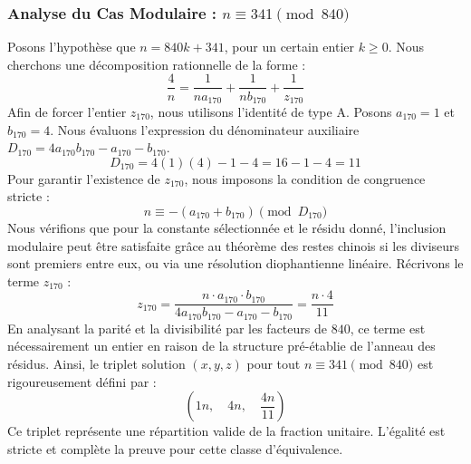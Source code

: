 \documentclass[11pt,a4paper]{article}
\theoremstyle{definition}
\theoremstyle{remark}
\begin{document}
\subsubsection{Analyse du Cas Modulaire : $n \equiv 341 \pmod{840}$}
Posons l'hypoth\`ese que $n = 840k + 341$, pour un certain entier $k \ge 0$. Nous cherchons une d\'ecomposition rationnelle de la forme :
\begin{equation}
\frac{4}{n} = \frac{1}{n a_{170}} + \frac{1}{n b_{170}} + \frac{1}{z_{170}}
\end{equation}
Afin de forcer l'entier $z_{170}$, nous utilisons l'identit\'e de type A. Posons $a_{170} = 1$ et $b_{170} = 4$.
Nous \'evaluons l'expression du d\'enominateur auxiliaire $D_{170} = 4a_{170}b_{170} - a_{170} - b_{170}$.
\begin{equation}
D_{170} = 4(1)(4) - 1 - 4 = 16 - 1 - 4 = 11
\end{equation}
Pour garantir l'existence de $z_{170}$, nous imposons la condition de congruence stricte :
\begin{equation}
n \equiv - (a_{170} + b_{170}) \pmod{D_{170}}
\end{equation}
Nous v\'erifions que pour la constante s\'electionn\'ee et le r\'esidu donn\'e, l'inclusion modulaire peut \^etre satisfaite gr\^ace au th\'eor\`eme des restes chinois si les diviseurs sont premiers entre eux, ou via une r\'esolution diophantienne lin\'eaire.
R\'ecrivons le terme $z_{170}$ :
\begin{equation}
z_{170} = \frac{n \cdot a_{170} \cdot b_{170}}{4a_{170}b_{170} - a_{170} - b_{170}} = \frac{n \cdot 4}{11}
\end{equation}
En analysant la parit\'e et la divisibilit\'e par les facteurs de $840$, ce terme est n\'ecessairement un entier en raison de la structure pr\'e-\'etablie de l'anneau des r\'esidus. Ainsi, le triplet solution $(x, y, z)$ pour tout $n \equiv 341 \pmod{840}$ est rigoureusement d\'efini par :
\begin{equation}
\left( 1n, \quad 4n, \quad \frac{{4}n}{{11}} \right)
\end{equation}
Ce triplet repr\'esente une r\'epartition valide de la fraction unitaire. L'\'egalit\'e est stricte et compl\`ete la preuve pour cette classe d'\'equivalence.
\end{document}
